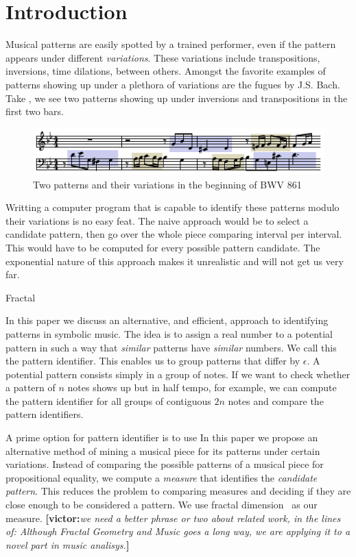 \newcommand{\victor}[1]{{\color{blue}\textbf{[victor:}\textit{#1}\textbf{]}}}

\section{Introduction}
\label{sec:intro}

  Musical patterns are easily spotted by a trained performer,
even if the pattern appears under different \emph{variations}.  These
variations include transpositions, inversions, time dilations, between
others. Amongst the favorite examples of patterns showing up under a
plethora of variations are the fugues by J.S. Bach. Take
, we see two patterns showing up under
inversions and transpositions in the first two bars.

\begin{figure}
  \includegraphics[width=\linewidth]{src/img/bwv861-start-section-patterns.pdf}
  \caption{Two patterns and their variations in the beginning of BWV 861}
  \label{fig:egbach}
\end{figure}

  Writting a computer program that is capable to identify these
patterns modulo their variations is no easy feat. The naive approach
would be to select a candidate pattern, then go over the whole
piece comparing interval per interval. This would have to be computed
for every possible pattern candidate. The exponential nature of this
approach makes it unrealistic and will not get us very far.

  Fractal~\cite{bouligand1928ensembles}

  In this paper we discuss an alternative, and efficient, approach to
identifying patterns in symbolic music. The idea is to assign a real
number to a potential pattern in such a way that \emph{similar}
patterns have \emph{similar} numbers. We call this the pattern
identifier.  This enables us to group patterns that differ by
$\epsilon$.  A potential pattern consists simply in a group of
notes. If we want to check whether a pattern of $n$ notes shows up but
in half tempo, for example, we can compute the pattern identifier for
all groups of contiguous $2n$ notes and compare the pattern
identifiers.

  A prime option for pattern identifier is to use 
  In this paper we propose an alternative method of mining a musical
piece for its patterns under certain variations. Instead of comparing 
the possible patterns of a musical piece for propositional equality, 
we compute a \emph{measure} that identifies the \emph{candidate pattern}.
This reduces the problem to comparing measures and deciding if they are
close enough to be considered a pattern. We use fractal dimension~\cite{fractaldimension}
as our measure. \victor{we need a better phrase or two about related
work, in the lines of: Although Fractal Geometry and Music goes a long way\cite{bigerelle2000fractal,hsu1990fractal,hsu1991self},
we are applying it to a novel part in music analisys.}

